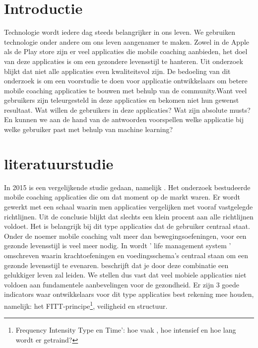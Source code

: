 
\section{Introductie} %
\label{sec:introductie}
Technologie wordt iedere dag steeds belangrijker in ons leven. We gebruiken technologie onder andere om ons leven aangenamer te maken. Zowel in de Apple als de Play store zijn er veel applicaties die mobile coaching aanbieden, het doel van deze applicaties is om een gezondere levensstijl te hanteren. Uit onderzoek blijkt dat niet alle applicaties even kwaliteitsvol zijn. \hfill \break \break
De bedoeling van dit onderzoek is om een voorstudie te doen voor applicatie ontwikkelaars om betere mobile coaching applicaties te bouwen met behulp van de community.Want veel gebruikers zijn teleurgesteld in deze applicaties en bekomen niet hun gewenst resultaat. Wat willen de gebruikers in deze applicaties? Wat zijn absolute musts? En kunnen we aan de hand van de antwoorden voorspellen welke applicatie bij welke gebruiker past met behulp van machine learning?



\section{literatuurstudie }
\label{sec:state-of-the-art}
In 2015 is een vergelijkende studie gedaan, namelijk \textcite{JMIR2015}. Het onderzoek bestudeerde mobile coaching applicaties die om dat moment op de markt waren. Er wordt gewerkt met een schaal waarin men applicaties vergelijken met vooraf vastgelegde richtlijnen. Uit de conclusie blijkt dat slechts een klein procent aan alle richtlijnen voldoet. Het is belangrijk bij dit type applicaties dat de gebruiker centraal staat. \break\break
Onder de noemer mobile coaching valt meer dan bewegingsoefeningen, voor een gezonde levensstijl is veel meer nodig. In \textcite{EQUILIBRIO2005}  wordt ' life management system ' omschreven waarin krachtoefeningen en voedingsschema's centraal staan om een gezonde levensstijl te evenaren.\textcite{EQUILIBRIO2005} beschrijft dat je door deze combinatie een gelukkiger leven zal leiden. \break
 \break
We stellen dus vast dat veel mobiele applicaties niet voldoen aan fundamentele aanbevelingen voor de gezondheid. Er zijn 3 goede indicators waar ontwikkelaars voor dit type applicaties best rekening mee houden, namelijk: het FITT-principe\footnote{Frequency Intensity Type en Time’: hoe vaak , hoe intensief en hoe lang wordt er getraind?
}, veiligheid en structuur.

